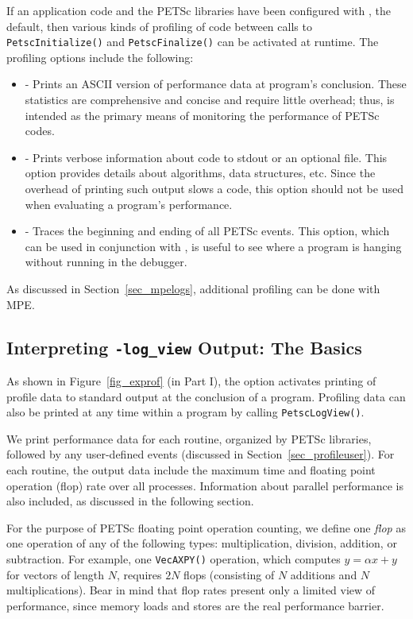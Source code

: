 If an application code and the PETSc libraries have been configured with
, the default,
then various kinds of profiling of code between calls to \lstinline{PetscInitialize()} and \lstinline{PetscFinalize()} can be
activated at runtime.  The profiling options include the following:
 
\begin{itemize}
\item {} - Prints an ASCII version of performance data
     at program's conclusion. These statistics are comprehensive and concise
     and require little overhead; thus,  is intended as
     the primary means of monitoring the performance of PETSc codes.
\item {} - Prints verbose information about code to
     stdout or an optional file. This option provides details about algorithms,
     data structures, etc. Since the overhead of printing such output slows a
     code, this option should not be used when evaluating a program's performance.
\item {} - Traces the beginning and ending of all
     PETSc events.  This option, which can be used in conjunction with
     , is useful to see where a program is hanging
     without running in the debugger.
\end{itemize}
 As discussed in Section~\ref{sec_mpelogs},
additional profiling can be done with MPE.

\subsection{Interpreting {\tt -log\_view} Output: The Basics}
\label{sec_ploginfo}

As shown in Figure~\ref{fig_exprof} (in Part I), the option
  activates printing of profile
data to standard output at the conclusion of a program.  Profiling
data can also be printed at any time within a program by calling \lstinline{PetscLogView()}.

We print performance data for each routine, organized by PETSc
libraries, followed by any user-defined events (discussed in
Section~\ref{sec_profileuser}).  For each routine, the output data
include the maximum time and floating point operation (flop) rate over
all processes.  Information about parallel performance is also
included, as discussed in the following section.

For the purpose of PETSc floating point operation counting, we define
one {\em flop} as one operation of any of the following types:
multiplication, division, addition, or subtraction.  For example, one
\lstinline{VecAXPY()} operation, which computes $y = \alpha x + y$ for
vectors of length $N$, requires $2N$ flops (consisting of $N$
additions and $N$ multiplications).  Bear in mind that flop rates
present only a limited view of performance, since memory loads and stores are
the real performance barrier.

